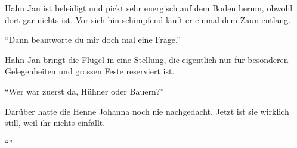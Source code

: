 Hahn Jan ist beleidigt und pickt sehr energisch auf dem Boden herum, obwohl
dort gar nichts ist. Vor sich hin schimpfend läuft er einmal dem Zaun entlang.


\enquote{Dann beantworte du mir doch mal eine Frage.}

Hahn Jan bringt die Flügel in eine Stellung, die eigentlich nur für
besonderen Gelegenheiten und grossen Feste reserviert ist.


\enquote{Wer war zuerst da, Hühner oder Bauern?}

Darüber hatte die Henne Johanna noch nie nachgedacht. Jetzt ist sie wirklich
still, weil ihr nichts einfällt. 




\enquote{}


\vfill
